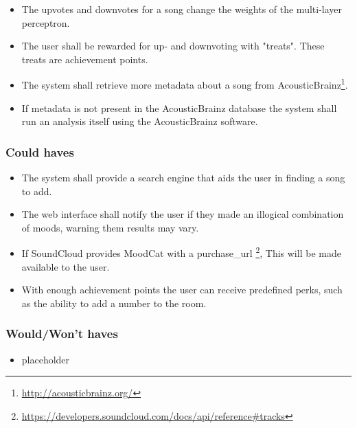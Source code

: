 \begin{itemize}
\item The upvotes and downvotes for a song change the weights of the multi-layer perceptron.

\item The user shall be rewarded for up- and downvoting with "treats". These treats are achievement points.

\item The system shall retrieve more metadata about a song from AcousticBrainz\footnote{\url{http://acousticbrainz.org/}}.

\item If metadata is not present in the AcousticBrainz database the system shall run an analysis itself using the AcousticBrainz software.

\end{itemize}

\subsubsection{Could haves}
\begin{itemize}
\item The system shall provide a search engine that aids the user in finding a song to add.

\item The web interface shall notify the user if they made an illogical combination of moods, warning them results may vary.

\item If SoundCloud provides MoodCat with a purchase\_url \footnote{\url{https://developers.soundcloud.com/docs/api/reference\#tracks}}, This will be made available to the user.

\item With enough achievement points the user can receive predefined perks, such as the ability to add a number to the room.


\end{itemize}

\subsubsection{Would/Won't haves}
\begin{itemize}
\item placeholder
\end{itemize}

